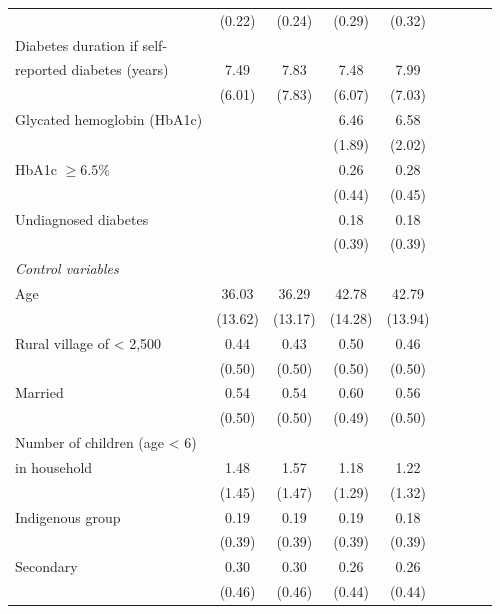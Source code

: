 \documentclass[12pt,english]{article}
\begin{document}
\begin{table}[p]
\begin{adjustbox}{max width=0.7\linewidth, center}
\begin{threeparttable}
{\begin{tabular}{l*{4}{SS}}
                    &      (0.22)&      (0.24)&      (0.29)&      (0.32)\\
Diabetes duration if self- &&&&\\
reported diabetes (years)   &        7.49&        7.83&        7.48&        7.99\\
                    &      (6.01)&      (7.83)&      (6.07)&      (7.03)\\
Glycated hemoglobin (HbA1c)&            &            &       6.46&        6.58\\
                    &            &            &      (1.89)&      (2.02)\\
HbA1c $\geq 6.5\%$  &            &            &        0.26&        0.28\\
                    &            &            &      (0.44)&      (0.45)\\
Undiagnosed diabetes&            &            &        0.18&        0.18\\
                    &            &            &      (0.39)&      (0.39)\\
\hspace*{10mm}\emph{Control variables} \\
Age                 &       36.03&       36.29&       42.78&       42.79\\
                    &     (13.62)&     (13.17)&     (14.28)&     (13.94)\\
Rural village of < 2,500&        0.44&        0.43&        0.50&        0.46\\
                    &      (0.50)&      (0.50)&      (0.50)&      (0.50)\\
Married             &        0.54&        0.54&        0.60&        0.56\\
                    &      (0.50)&      (0.50)&      (0.49)&      (0.50)\\
Number of children (age < 6) &&&&\\
in household&        1.48&        1.57&        1.18&        1.22\\
                    &      (1.45)&      (1.47)&      (1.29)&      (1.32)\\
Indigenous group    &        0.19&        0.19&        0.19&        0.18\\
                    &      (0.39)&      (0.39)&      (0.39)&      (0.39)\\
Secondary           &        0.30&        0.30&        0.26&        0.26\\
                    &      (0.46)&      (0.46)&      (0.44)&      (0.44)\\

\end{tabular}}
\end{threeparttable}
\end{adjustbox}
\end{table}
\end{document}
